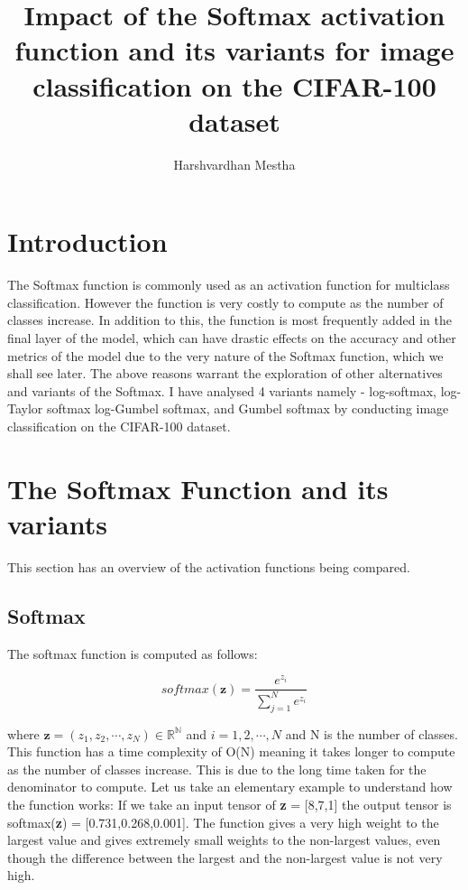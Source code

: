 \documentclass{article}
\title{Impact of the Softmax activation function and its variants for image classification on the CIFAR-100 dataset}
\author{Harshvardhan Mestha}
\begin{document}

\tableofcontents
\pagebreak
\maketitle


\section{Introduction}
The Softmax function is commonly used as an activation function for multiclass classification.
However the function is very costly to compute as the number of classes increase.
In addition to this, the function is most frequently added in the final layer of the model, which can have drastic effects on the accuracy and other metrics of the model due to the very nature of the Softmax function, which we shall see later.
The above reasons warrant the exploration of other alternatives and variants of the Softmax.
I have analysed 4 variants namely - log-softmax, log-Taylor softmax log-Gumbel softmax, and Gumbel softmax by conducting image classification on the CIFAR-100 dataset.


\section{The Softmax Function and its variants}
This section has an overview of the activation functions being compared.
\subsection{Softmax}
The softmax function is computed as follows:

\[softmax(\textbf{z}) = \frac{e^{z_i}}{\sum_{j=1}^{N} e^{z_i}}\]

where $\textbf{z} = (z_1,z_2,\cdots,z_N) \in \mathbb{R^N}$ and $i = 1,2,\cdots,N$ and N is the number of classes.
\newline
\newline
    This function has a time complexity of O(N) meaning it takes longer to compute as the number of classes increase. This is due to the long time taken for the denominator to compute.
\newline
    Let us take an elementary example to understand how the function works:
    If we take an input tensor of \textbf{z} = [8,7,1] the output tensor is softmax(\textbf{z}) = [0.731,0.268,0.001]. The function gives a very high weight to the largest value and gives extremely small weights to the non-largest values, even though the difference between the largest and the non-largest value is not very high.     
    
\end{document}
